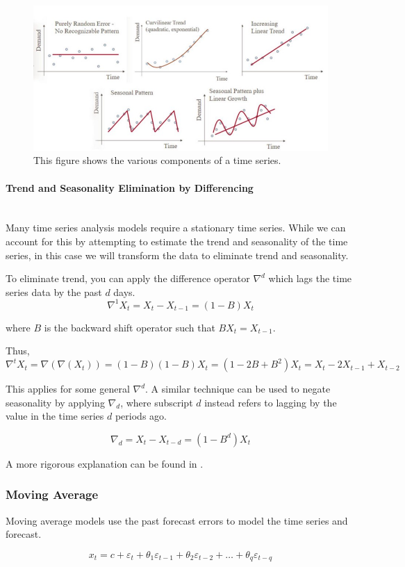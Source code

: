 \documentclass[12pt]{article}
\newcommand{\subsubsubsection}[1]{\paragraph{#1}\mbox{}\\}
\begin{document}
\begin{figure}[ht]
	\centering
	\includegraphics[width=.75\textwidth]{trend.jpeg}
	\caption{This figure shows the various components of a time series. \cite{trend}}
	\label{trends}
\end{figure}

\subsubsubsection{Trend and Seasonality Elimination by Differencing}

Many time series analysis models require a stationary time series. While we can account for this by attempting to estimate the trend and seasonality of the time series, in this case we will transform the data to eliminate trend and seasonality.

To eliminate trend, you can apply the difference operator $\nabla^d$ which lags the time series data by the past $d$ days.
$$\nabla^1 X_t = X_t - X_{t-1}=(1-B)X_t$$

where $B$ is the backward shift operator such that $BX_t = X_{t-1}$.

Thus, $$\nabla^t X_t = \nabla(\nabla(X_t)) = (1-B)(1-B)X_t = (1-2B+B^2)X_t = X_t-2X_{t-1}+X_{t-2}$$

This applies for some general $\nabla^d$. A similar technique can be used to negate seasonality by applying $\nabla_d$, where subscript $d$ instead refers to lagging by the value in the time series $d$ periods ago.

$$\nabla_d = X_t - X_{t-d} = (1-B^d) X_t$$

A more rigorous explanation can be found in \cite[22-32]{timeseries}.

\subsubsection{Moving Average}
Moving average models use the past forecast errors to model the time series and forecast. 

$$ x_{t} = c + \varepsilon_t + \theta_{1}\varepsilon_{t-1} + \theta_{2}\varepsilon_{t-2} + \dots + \theta_{q}\varepsilon_{t-q}$$
\end{document}
